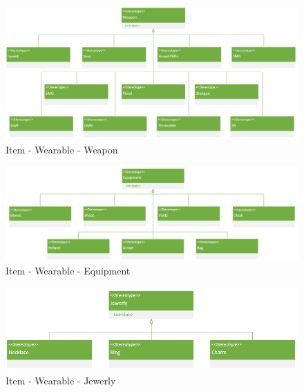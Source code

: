 \newpage
\begin{figure}[H]
    \begin{center}
    \includegraphics[width=\linewidth]{10_img/Z_annexeA/item_wearable_weapon.PNG} 
    \caption{Item - Wearable - Weapon}
    \label{A-Weapon}
    \end{center}
\end{figure}

\begin{figure}[H]
    \begin{center}
    \includegraphics[width=\linewidth]{10_img/Z_annexeA/item_wearable_equipment.PNG} 
    \caption{Item - Wearable - Equipment}
    \label{A-Equipment}
    \end{center}
\end{figure}

\begin{figure}[H]
    \begin{center}
    \includegraphics[width=14cm]{10_img/Z_annexeA/item_wearable_jewerly.PNG} 
    \caption{Item - Wearable - Jewerly}
    \label{A-Jewerly}
    \end{center}
\end{figure}

